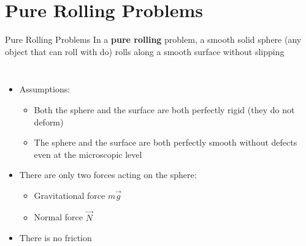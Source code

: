 \documentclass[12pt,compress,aspectratio=169]{beamer}
\begin{document}
\section{Pure Rolling Problems}

\begin{frame}{Pure Rolling Problems}
  In a \textbf{pure rolling} problem, a smooth solid sphere (any object that
  can roll with do) rolls along a smooth surface without slipping
  \begin{columns}
    \centering

    \begin{itemize}
    \item Assumptions:
      \begin{itemize}
      \item Both the sphere and the surface are both perfectly rigid (they
        do not deform)
      \item The sphere and the surface are both perfectly smooth without defects
        even at the microscopic level
      \end{itemize}
    \item There are only two forces acting on the sphere:
      \begin{itemize}
      \item Gravitational force $m\vec g$
      \item Normal force $\vec N$
      \end{itemize}
    \item There is no friction
    \end{itemize}
  \end{columns}
\end{frame}
\end{document}
